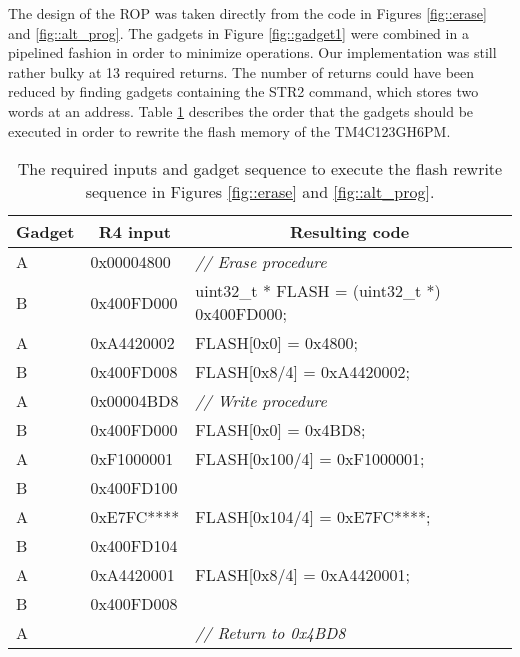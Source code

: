 The design of the ROP was taken directly from the code in Figures \ref{fig::erase} and \ref{fig::alt_prog}. The gadgets in Figure \ref{fig::gadget1} were combined in a pipelined fashion in order to minimize operations. Our implementation was still rather bulky at 13 required returns. The number of returns could have been reduced by finding gadgets containing the STR2 command, which stores two words at an address. Table \ref{tab:gadgets} describes the order that the gadgets should be executed in order to rewrite the flash memory of the TM4C123GH6PM.

\begin{table}[htbp]
  \centering
  \caption{The required inputs and gadget sequence to execute the flash rewrite sequence in Figures \ref{fig::erase} and \ref{fig::alt_prog}. }
    \begin{tabular}{rrr}
    \toprule
    \multicolumn{1}{c}{Gadget} & \multicolumn{1}{c}{R4 input} & \multicolumn{1}{c}{Resulting code} \\
    \midrule
    \multicolumn{1}{l}{A} & \multicolumn{1}{l}{0x00004800} & \multicolumn{1}{l}{\textit{// Erase procedure}} \\
    \multicolumn{1}{l}{B} & \multicolumn{1}{l}{0x400FD000} & \multicolumn{1}{l}{uint32\_t * FLASH = (uint32\_t *) 0x400FD000;} \\
    \multicolumn{1}{l}{A} & \multicolumn{1}{l}{0xA4420002} & \multicolumn{1}{l}{FLASH[0x0] = 0x4800;} \\
    \multicolumn{1}{l}{B} & \multicolumn{1}{l}{0x400FD008} & \multicolumn{1}{l}{FLASH[0x8/4] = 0xA4420002;} \\
    \multicolumn{1}{l}{A} & \multicolumn{1}{l}{0x00004BD8} & \multicolumn{1}{l}{\textit{// Write procedure}} \\
    \multicolumn{1}{l}{B} & \multicolumn{1}{l}{0x400FD000} & \multicolumn{1}{l}{FLASH[0x0] = 0x4BD8;} \\
    \multicolumn{1}{l}{A} & \multicolumn{1}{l}{0xF1000001} & \multicolumn{1}{l}{FLASH[0x100/4] = 0xF1000001;} \\
    \multicolumn{1}{l}{B} & \multicolumn{1}{l}{0x400FD100} & \multicolumn{1}{l}{} \\
    \multicolumn{1}{l}{A} & \multicolumn{1}{l}{0xE7FC****} & \multicolumn{1}{l}{FLASH[0x104/4] = 0xE7FC****;} \\
    \multicolumn{1}{l}{B} & \multicolumn{1}{l}{0x400FD104} & \multicolumn{1}{l}{} \\
    \multicolumn{1}{l}{A} & \multicolumn{1}{l}{0xA4420001} & \multicolumn{1}{l}{FLASH[0x8/4] = 0xA4420001;} \\
    \multicolumn{1}{l}{B} & \multicolumn{1}{l}{0x400FD008} & \multicolumn{1}{l}{} \\
    \multicolumn{1}{l}{A} & \multicolumn{1}{l}{} & \multicolumn{1}{l}{\textit{// Return to 0x4BD8}} \\

    \bottomrule
    \end{tabular}%
  \label{tab:gadgets}%
\end{table}%
